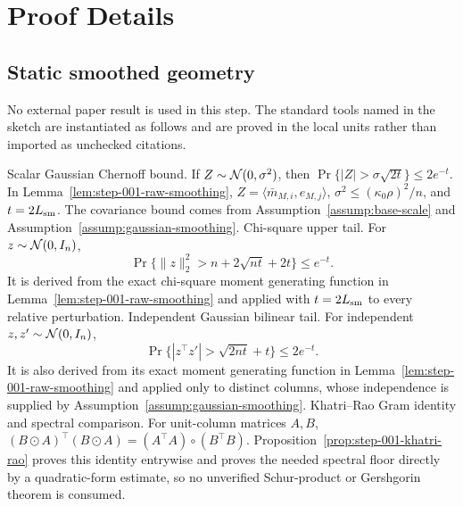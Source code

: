 \appendix

\section{Proof Details}\label{sec:proof-details}

\subsection{Static smoothed geometry}\label{app:step-001}

No external paper result is used in this step. The standard tools named in the
sketch are instantiated as follows and are proved in the local units rather
than imported as unchecked citations.

Scalar Gaussian Chernoff bound. If $Z\sim {\cal N}(0,\sigma^2)$,
   then
   $\Pr\{|Z|>\sigma\sqrt{2t}\}\le2e^{-t}$.
   In Lemma~\ref{lem:step-001-raw-smoothing},
   $Z=\langle \bar m_{M,i},e_{M,j}\rangle$,
   $\sigma^2\le(\kappa _0\rho)^2/n$, and $t=2L_{\rm sm}$.
   The covariance bound comes from Assumption~\ref{assump:base-scale} and
   Assumption~\ref{assump:gaussian-smoothing}.
Chi-square upper tail. For $z\sim {\cal N}(0,I_n)$,
   \[
   \Pr\{\|z\|_2^2>n+2\sqrt{nt}+2t\}\le e^{-t}.
   \]
   It is derived from the exact chi-square moment generating function in
   Lemma~\ref{lem:step-001-raw-smoothing} and applied with
   $t=2L_{\rm sm}$ to every relative perturbation.
Independent Gaussian bilinear tail. For independent
   $z,z'\sim {\cal N}(0,I_n)$,
   \[
   \Pr\{|z^\top z'|>\sqrt{2nt}+t\}\le2e^{-t}.
   \]
   It is also derived from its exact moment generating function in
   Lemma~\ref{lem:step-001-raw-smoothing} and applied only to distinct
   columns, whose independence is supplied by
   Assumption~\ref{assump:gaussian-smoothing}.
Khatri--Rao Gram identity and spectral comparison. For unit-column
   matrices $A,B$,
   $(B\odot A)^\top(B\odot A)=(A^\top A)\circ(B^\top B)$.
   Proposition~\ref{prop:step-001-khatri-rao} proves this identity
   entrywise and proves the needed spectral floor directly by a quadratic-form
   estimate, so no unverified Schur-product or Gershgorin theorem is consumed.

